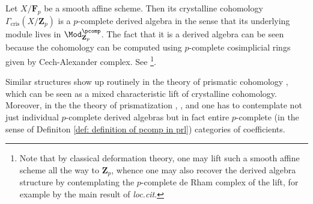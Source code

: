 \documentclass[10pt,reqno]{amsart}
\numberwithin{equation}{section}
\newcommand{\ZZ}{\mathbf{Z}}
\newcommand{\FF}{\mathbf{F}}
\begin{document}
\begin{example}
    Let $X/\FF_p$ be a smooth affine scheme. Then its crystalline cohomology $\Gamma_{\mathrm{cris}}(X/\ZZ_p)$ is a $p$-complete derived algebra in the sense that its underlying module lives in $\Mod_{\ZZ_p}^{\pcomp}$. The fact that it is a derived algebra can be seen because the cohomology can be computed using $p$-complete cosimplicial rings given by Cech-Alexander complex. See \cite[\S~2]{BhattDeJong2011CrystallineDeRham}\footnote{Note that by classical deformation theory, one may lift such a smooth affine scheme all the way to $\ZZ_p$, whence one may also recover the derived algebra structure by contemplating the $p$-complete de Rham complex of the lift, for example by the main result of \emph{loc.cit}.}.
\end{example}

Similar structures show up routinely in the theory of prismatic cohomology \cite{BS19}, which can be seen as a mixed characteristic lift of crystalline cohomology. Moreover, in the the theory of prismatization \cite{Drin20}, \cite{APC}, \cite{APCII} and \cite{Bhatt22} one has to contemplate not just individual $p$-complete derived algebras but in fact entire $p$-complete (in the sense of Definiton \ref{def: definition of pcomp in prl})  categories of coefficients. 
\end{document}
